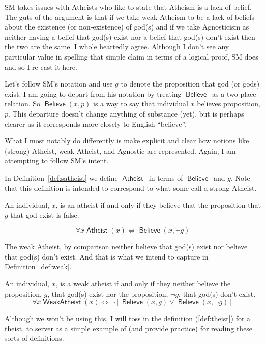 \documentclass[12pt]{article}
\providecommand{\lor}{\vee}
\providecommand{\liff}{\iff}
\providecommand{\lnot}{\neg}
\providecommand{\lall}{\forall}
\newcommand{\rel}[1]{\ensuremath{\mathop{\mathsf{#1}}}}
\newcommand{\rlbelieve}{\rel{Believe}}
\newcommand{\rlatheist}{\rel{Atheist}}
\newcommand{\rlwa}{\rel{WeakAtheist}}
\begin{document}
SM takes issues with Atheists who like to state that Atheism is a lack of belief.
The guts of the argument is that if we take weak Atheism to be a lack of beliefs about the existence (or non-existence) of god(s) and if we take Agnosticism as neither having a belief that god(s) exist nor a belief that god(s) don't exist then the two are the same.
I whole heartedly agree. Although I don't see any particular value in spelling that simple claim in terms of a logical proof, SM does and so I re-cast it here.

Let's follow SM's notation and use $g$ to denote the proposition that god (or gods) exist.
I am going to depart from his notation by treating \rlbelieve\ as a two-place relation. So $\rlbelieve(x, p)$ is a way to say that individual $x$ believes proposition, $p$. This departure doesn't change anything of substance (yet), but is perhaps clearer as it corresponds more closely to English “believe”.

What I most notably do differently is make explicit and clear how notions like (strong) Atheist, weak Atheist, and Agnostic are represented. Again, I am attempting to follow SM's intent.

In Definition~\ref{def:satheist} we define  \rlatheist\ in terms of \rlbelieve\ and $g$. Note that this definition is intended to correspond to what some call a strong Atheist.

\begin{definition}[Atheist]\label{def:satheist}
    An individual, $x$, is an atheist if and only if they believe that the proposition that $g$ that god exist is false.

    \[
        \lall x \rlatheist(x) \liff \rlbelieve(x, \lnot g)
    \]
\end{definition}

The weak Atheist, by comparison neither believe that god(s) exist nor believe that god(s) don't exist. And that is what we intend to capture in Definition~\ref{def:weak}.

\begin{definition}\label{def:weak}
    An individual, $x$, is a weak atheist if and only if they neither believe the proposition, $g$, that god(s) exist nor the proposition, $\lnot g$, that god(s) don't exist.
    \[
        \lall x \rlwa(x) \liff
          \lnot\left[\rlbelieve(x, g) \lor \rlbelieve(x, \lnot g)\right]
    \]
\end{definition}

Although we won't be using this, I will toss in the definition (\ref{def:theist}) for a theist, to server as a simple example of (and provide practice) for reading these sorts of definitions.
\end{document}
